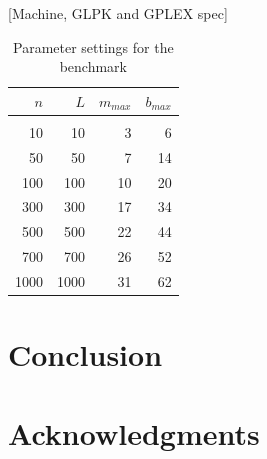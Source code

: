\documentclass{article}
\begin{document}
[Machine, GLPK and GPLEX spec]

\begin{table}
	\caption{Parameter settings for the benchmark}\label{tab:settings}
	\begin{center}
	\begin{tabular}{ r r r r }
		$n$&$L$&$m_{max}$&$b_{max}$\\
		\hline\\
		10&	10&	3&	6 \\ 
		50&	50&	7&	14\\
		100&100&10&20\\
		300&300&17&34\\
		500&500&22&44\\
		700&700&26&52\\
		1000&1000&31&62
	\end{tabular}
	\end{center}
\end{table}


\section{Conclusion}

\section*{Acknowledgments}
\end{document}
